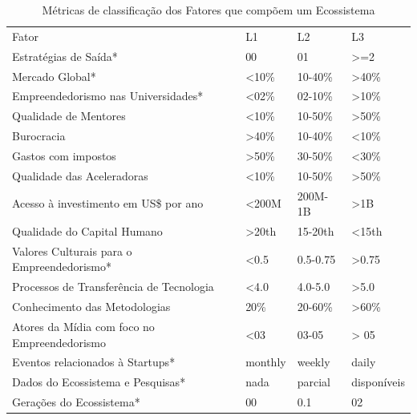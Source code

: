 \begin{table}[!htb]
\centering
\caption{Métricas de classificação dos Fatores que compõem um Ecossistema}
\label{tabela:metricas_de_classificacao_dos_fatores}
\begin{tabular}{llll}
Fator                                                      &     L1     &     L2     &     L3      \\
Estratégias de Saída*                                      &     00     &     01     &    >=2      \\
Mercado Global*                                            &    <10\%   &   10-40\%  &    >40\%    \\
Empreendedorismo nas Universidades*                        &    <02\%   &   02-10\%  &    >10\%    \\
Qualidade de Mentores                                      &    <10\%   &   10-50\%  &    >50\%    \\
Burocracia                                                 &    >40\%   &   10-40\%  &    <10\%    \\
Gastos com impostos                                        &    >50\%   &   30-50\%  &    <30\%    \\
Qualidade das Aceleradoras                                 &    <10\%   &   10-50\%  &    >50\%    \\
Acesso à investimento em US\$ por ano                      &    <200M   &   200M-1B  &    >1B      \\
Qualidade do Capital Humano                                &    >20th   &   15-20th  &    <15th    \\
Valores Culturais para o Empreendedorismo*                 &    <0.5    &   0.5-0.75 &    >0.75    \\
Processos de Transferência de Tecnologia                   &    <4.0    &   4.0-5.0  &    >5.0     \\
Conhecimento das Metodologias                              &    20\%    &   20-60\%  &    >60\%    \\
Atores da Mídia com foco no Empreendedorismo               &    <03     &   03-05    &    > 05     \\
Eventos relacionados à Startups*                           &   monthly  &   weekly   &    daily    \\
Dados do Ecossistema e Pesquisas*                          &    nada    & parcial    & disponíveis \\
Gerações do Ecossistema*                                   &     00     &    0.1     &    02       \\

\end{tabular}
\end{table}
